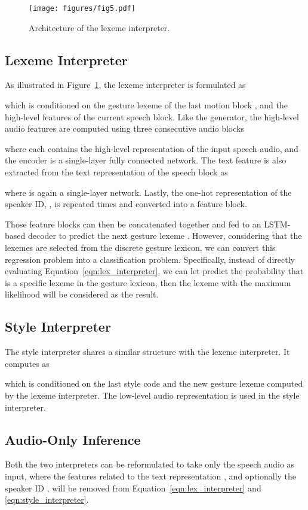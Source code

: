 \documentclass[acmtog,authorversion]{acmart}
\newcommand{\fig}{Figure{}~}
\newcommand{\eqn}{Equation{}~}
\begin{document}
\begin{figure}[t]
    \centering
    \texttt{[image: figures/fig5.pdf]}
    \caption{Architecture of the lexeme interpreter.}
    \Description{}
    \label{fig:interpreters}
\end{figure}

\subsection{Lexeme Interpreter}
\label{subsec:lexeme_interpreter}
As illustrated in \fig\ref{fig:interpreters}, the lexeme interpreter is formulated as

which is conditioned on the gesture lexeme of the last motion block , and the high-level features of the current speech block. Like the generator, the high-level audio features  are computed using three consecutive audio blocks

where each  contains the high-level representation of the input speech audio, and the encoder  is a single-layer fully connected network. 
The text feature  is also extracted from the text representation of the speech block as 

where  is again a single-layer network. Lastly, the one-hot representation of the speaker ID, , is repeated  times and converted into a feature block.

Those feature blocks can then be concatenated together and fed to an LSTM-based decoder to predict the next gesture lexeme . However, considering that the lexemes are selected from the discrete gesture lexicon, we can convert this regression problem into a classification problem. Specifically, instead of directly evaluating \eqn\eqref{eqn:lex_interpreter}, we can let  predict the probability that  is a specific lexeme in the gesture lexicon, then the lexeme with the maximum likelihood will be considered as the result.

\subsection{Style Interpreter}
The style interpreter shares a similar structure with the lexeme interpreter. It computes  as

which is conditioned on the last style code and the new gesture lexeme computed by the lexeme interpreter. The low-level audio representation  is used in the style interpreter.

\subsection{Audio-Only Inference}
\label{subsec:inference_based_on_audio_only}
Both the two interpreters can be reformulated to take only the speech audio as input, where the features related to the text representation , and optionally the speaker ID , will be removed from \eqn\eqref{eqn:lex_interpreter} and \eqref{eqn:style_interpreter}.
\end{document}
